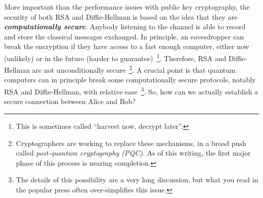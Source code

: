 More important than the performance issues with public key cryptography, the security of both RSA and Diffie-Hellman is based on the idea that they are \textbf{\emph{computationally secure}}.
Anybody listening to the channel is able to record and store the classical messages exchanged.
In principle, an eavesdropper can break the encryption if they have access to a fast enough computer, either now (unlikely) or in the future (harder to guarantee)~\footnote{This is sometimes called ``harvest now, decrypt later''.}.
Therefore, RSA and Diffie-Hellman are not unconditionally secure~\footnote{Cryptographers are working to replace these mechanisms, in a broad push called \emph{post-quantum cryptography (PQC)}.
As of this writing, the first major phase of this process is nearing completion.}.
A crucial point is that quantum computers can in principle break some computationally secure protocols, notably RSA and Diffie-Hellman, with relative ease~\footnote{The details of this possibility are a very long discussion, but what you read in the popular press often over-simplifies this issue.}.
So, how can we actually establish a secure connection between Alice and Bob?

